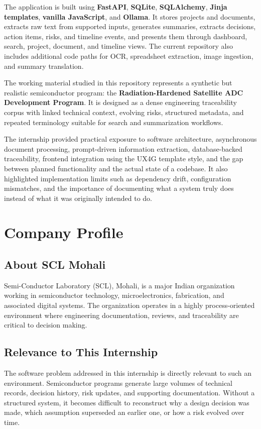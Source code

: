 \documentclass[12pt, a4paper]{article}
\begin{document}
The application is built using \textbf{FastAPI}, \textbf{SQLite}, \textbf{SQLAlchemy}, \textbf{Jinja templates}, \textbf{vanilla JavaScript}, and \textbf{Ollama}. It stores projects and documents, extracts raw text from supported inputs, generates summaries, extracts decisions, action items, risks, and timeline events, and presents them through dashboard, search, project, document, and timeline views. The current repository also includes additional code paths for OCR, spreadsheet extraction, image ingestion, and summary translation.

The working material studied in this repository represents a synthetic but realistic semiconductor program: the \textbf{Radiation-Hardened Satellite ADC Development Program}. It is designed as a dense engineering traceability corpus with linked technical context, evolving risks, structured metadata, and repeated terminology suitable for search and summarization workflows.

The internship provided practical exposure to software architecture, asynchronous document processing, prompt-driven information extraction, database-backed traceability, frontend integration using the UX4G template style, and the gap between planned functionality and the actual state of a codebase. It also highlighted implementation limits such as dependency drift, configuration mismatches, and the importance of documenting what a system truly does instead of what it was originally intended to do.

\newpage
\tableofcontents
{}
\newpage
\listoffigures
{}
\listoftables
{}
\newpage
{}

\section{Company Profile}
\subsection{About SCL Mohali}
Semi-Conductor Laboratory (SCL), Mohali, is a major Indian organization working in semiconductor technology, microelectronics, fabrication, and associated digital systems. The organization operates in a highly process-oriented environment where engineering documentation, reviews, and traceability are critical to decision making.

\subsection{Relevance to This Internship}
The software problem addressed in this internship is directly relevant to such an environment. Semiconductor programs generate large volumes of technical records, decision history, risk updates, and supporting documentation. Without a structured system, it becomes difficult to reconstruct why a design decision was made, which assumption superseded an earlier one, or how a risk evolved over time.
\end{document}
